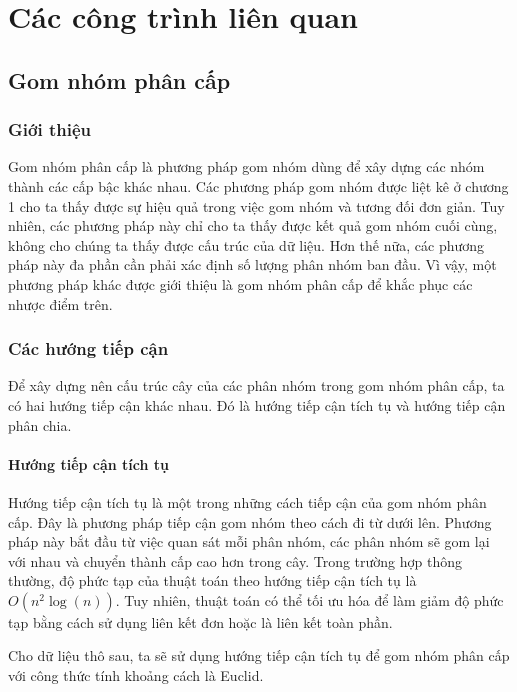 \chapter{Các công trình liên quan}
\label{Chapter2}

\section{Gom nhóm phân cấp}
\subsection{Giới thiệu}
Gom nhóm phân cấp là phương pháp gom nhóm dùng để xây dựng các nhóm thành các cấp bậc khác nhau.
Các phương pháp gom nhóm được liệt kê ở chương 1 cho ta thấy được sự hiệu quả trong việc gom nhóm và tương đối đơn giản.
Tuy nhiên, các phương pháp này chỉ cho ta thấy được kết quả gom nhóm cuối cùng, không cho chúng ta thấy được cấu trúc của dữ liệu.
Hơn thế nữa, các phương pháp này đa phần cần phải xác định số lượng phân nhóm ban đầu.
Vì vậy, một phương pháp khác được giới thiệu là gom nhóm phân cấp để khắc phục các nhược điểm trên.

\subsection{Các hướng tiếp cận}
Để xây dựng nên cấu trúc cây của các phân nhóm trong gom nhóm phân cấp, ta có hai hướng tiếp cận khác nhau. Đó là hướng tiếp cận tích tụ và hướng tiếp cận phân chia.

	\subsubsection{Hướng tiếp cận tích tụ}
		Hướng tiếp cận tích tụ là một trong những cách tiếp cận của gom nhóm phân cấp.
		Đây là phương pháp tiếp cận gom nhóm theo cách đi từ dưới lên.
		Phương pháp này bắt đầu từ việc quan sát mỗi phân nhóm, các phân nhóm sẽ gom lại với nhau và chuyển thành cấp cao hơn trong cây.
		Trong trường hợp thông thường, độ phức tạp của thuật toán theo hướng tiếp cận tích tụ là $O(n^2\log(n))$.
		Tuy nhiên, thuật toán có thể tối ưu hóa để làm giảm độ phức tạp bằng cách sử dụng liên kết đơn hoặc là liên kết toàn phần.
		
		Cho dữ liệu thô sau, ta sẽ sử dụng hướng tiếp cận tích tụ để gom nhóm phân cấp với công thức tính khoảng cách là Euclid.
		
